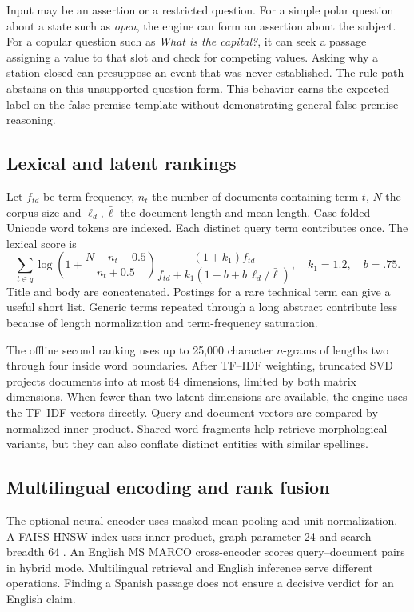 Input may be an assertion or a restricted question. For a simple polar question about a state such as \emph{open}, the engine can form an assertion about the subject. For a copular question such as \emph{What is the capital?}, it can seek a passage assigning a value to that slot and check for competing values. Asking why a station closed can presuppose an event that was never established. The rule path abstains on this unsupported question form. This behavior earns the expected label on the false-premise template without demonstrating general false-premise reasoning.

\subsection{Lexical and latent rankings}
Let $f_{td}$ be term frequency, $n_t$ the number of documents containing term $t$, $N$ the corpus size and $\ell_d,\bar\ell$ the document length and mean length. Case-folded Unicode word tokens are indexed. Each distinct query term contributes once. The lexical score is
\[
 \sum_{t\in q}\log\!\left(1+\frac{N-n_t+0.5}{n_t+0.5}\right)
 \frac{(1+k_1)f_{td}}{f_{td}+k_1(1-b+b\,\ell_d/\bar\ell)},\quad k_1=1.2,\quad b=.75 .
\]
Title and body are concatenated. Postings for a rare technical term can give a useful short list. Generic terms repeated through a long abstract contribute less because of length normalization and term-frequency saturation.

The offline second ranking uses up to 25,000 character $n$-grams of lengths two through four inside word boundaries. After TF--IDF weighting, truncated SVD projects documents into at most 64 dimensions, limited by both matrix dimensions. When fewer than two latent dimensions are available, the engine uses the TF--IDF vectors directly. Query and document vectors are compared by normalized inner product. Shared word fragments help retrieve morphological variants, but they can also conflate distinct entities with similar spellings.

\subsection{Multilingual encoding and rank fusion}
The optional neural encoder uses masked mean pooling and unit normalization. A FAISS HNSW index uses inner product, graph parameter 24 and search breadth 64 \cite{HNSW}. An English MS MARCO cross-encoder scores query--document pairs in hybrid mode. Multilingual retrieval and English inference serve different operations. Finding a Spanish passage does not ensure a decisive verdict for an English claim.

